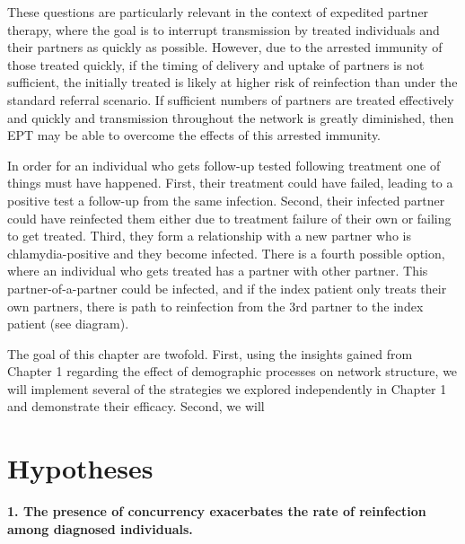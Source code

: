 \documentclass [11pt, proquest] {uwthesis}[2015/03/03]
\begin{document}
These questions are particularly relevant in the context of expedited partner therapy, where the goal is to interrupt transmission by treated individuals and their partners as quickly as possible. However, due to the arrested immunity of those treated quickly, if the timing of delivery and uptake of partners is not sufficient, the initially treated is likely at higher risk of reinfection than under the standard referral scenario. If sufficient numbers of partners are treated effectively and quickly and transmission throughout the network is greatly diminished, then EPT may be able to overcome the effects of this arrested immunity.

In order for an individual who gets follow-up tested following treatment one of things must have happened. First, their treatment could have failed, leading to a positive test a follow-up from the same infection. Second, their infected partner could have reinfected them either due to treatment failure of their own or failing to get treated. Third, they form a relationship with a new partner who is chlamydia-positive and they become infected. There is a fourth possible option, where an individual who gets treated has a partner with other partner. This partner-of-a-partner could be infected, and if the index patient only treats their own partners, there is path to reinfection from the 3rd partner to the index patient (see diagram).

The goal of this chapter are twofold. First, using the insights gained from Chapter 1 regarding the effect of demographic processes on network structure, we will implement several of the strategies we explored independently in Chapter 1 and demonstrate their efficacy. Second, we will

\hypertarget{hypotheses}{%
\section{Hypotheses}\label{hypotheses}}

\textbf{1. The presence of concurrency exacerbates the rate of reinfection among diagnosed individuals.}
\end{document}
